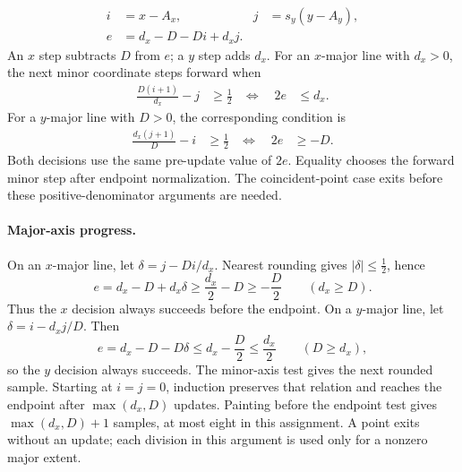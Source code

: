 \begin{align*}
  i & = x-A_x,         & j & = s_y(y-A_y), \\
  e & = d_x-D-Di+d_xj.
\end{align*}
An $x$ step subtracts $D$ from $e$; a $y$ step adds $d_x$.
For an $x$-major line with $d_x>0$, the next minor coordinate steps forward when
\begin{align*}
  \frac{D(i+1)}{d_x}-j & \ge \frac12
                       & \Longleftrightarrow\quad 2e & \le d_x.
\end{align*}
For a $y$-major line with $D>0$, the corresponding condition is
\begin{align*}
  \frac{d_x(j+1)}{D}-i & \ge \frac12
                       & \Longleftrightarrow\quad 2e & \ge -D.
\end{align*}
Both decisions use the same pre-update value of $2e$. Equality chooses the forward
minor step after endpoint normalization. The coincident-point case exits before
these positive-denominator arguments are needed.


\paragraph{Major-axis progress.}
On an $x$-major line, let $\delta=j-Di/d_x$. Nearest rounding gives
$|\delta|\le\tfrac12$, hence
\[
  e=d_x-D+d_x\delta\ge\frac{d_x}{2}-D\ge-\frac D2
  \qquad(d_x\ge D).
\]
Thus the $x$ decision always succeeds before the endpoint.
On a $y$-major line, let $\delta=i-d_xj/D$. Then
\[
  e=d_x-D-D\delta\le d_x-\frac D2\le\frac{d_x}{2}
  \qquad(D\ge d_x),
\]
so the $y$ decision always succeeds. The minor-axis test gives the next rounded
sample. Starting at $i=j=0$, induction preserves that relation and reaches the
endpoint after $\max(d_x,D)$ updates. Painting before the endpoint test gives
$\max(d_x,D)+1$ samples, at most eight in this assignment. A point exits without
an update; each division in this argument is used only for a nonzero major extent.

